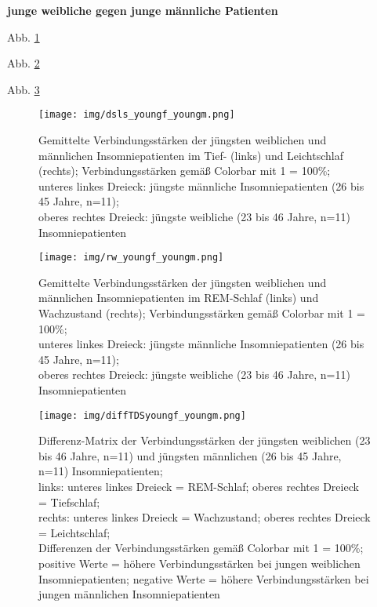 \textbf{junge weibliche gegen junge männliche Patienten}

Abb. \ref{fig:dsls_youngf_youngm}

Abb. \ref{fig:rw_youngf_youngm}

Abb. \ref{fig:diffTDSyoungf_youngm}

\begin{figure}[H]
	\centering
	\texttt{[image: img/dsls\_youngf\_youngm.png]}
	\caption[Verbindungsstärken der jüngsten weiblichen und männlichen Insomniepatienten im Tief- und Leichtschlaf]{Gemittelte Verbindungsstärken der jüngsten weiblichen und männlichen Insomniepatienten im Tief- (links) und Leichtschlaf (rechts); Verbindungsstärken gemäß Colorbar mit 1 = 100\%;\\unteres linkes Dreieck: jüngste männliche Insomniepatienten (26 bis 45 Jahre, n=11);\\oberes rechtes Dreieck: jüngste weibliche (23 bis 46 Jahre, n=11) Insomniepatienten}
	\label{fig:dsls_youngf_youngm}
\end{figure}

\begin{figure}[H]
	\centering
	\texttt{[image: img/rw\_youngf\_youngm.png]}
	\caption[Verbindungsstärken der jüngsten weiblichen und männlichen Insomniepatienten im REM-Schlaf und Wachzustand]{Gemittelte Verbindungsstärken der jüngsten weiblichen und männlichen Insomniepatienten im REM-Schlaf (links) und Wachzustand (rechts); Verbindungsstärken gemäß Colorbar mit 1 = 100\%;\\unteres linkes Dreieck: jüngste männliche Insomniepatienten (26 bis 45 Jahre, n=11);\\oberes rechtes Dreieck: jüngste weibliche (23 bis 46 Jahre, n=11) Insomniepatienten}
	\label{fig:rw_youngf_youngm}
\end{figure}

\begin{figure}[H]
	\centering
	\texttt{[image: img/diffTDSyoungf\_youngm.png]}
	\caption[Differenz-Matrix der Verbindungsstärken der jüngsten weiblichen und männlichen Insomniepatienten]{Differenz-Matrix der Verbindungsstärken der jüngsten weiblichen (23 bis 46 Jahre, n=11) und jüngsten männlichen (26 bis 45 Jahre, n=11) Insomniepatienten;\\links: unteres linkes Dreieck = REM-Schlaf; oberes rechtes Dreieck = Tiefschlaf;\\rechts: unteres linkes Dreieck = Wachzustand; oberes rechtes Dreieck = Leichtschlaf;\\Differenzen der Verbindungsstärken gemäß Colorbar mit 1 = 100\%;\\positive Werte = höhere Verbindungsstärken bei jungen weiblichen Insomniepatienten; negative Werte = höhere Verbindungsstärken bei jungen männlichen Insomniepatienten}
	\label{fig:diffTDSyoungf_youngm}
\end{figure}



